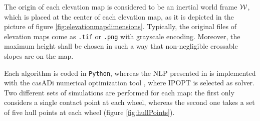The origin of each elevation map is considered to be an inertial world frame $\mathcal{W}$, which is placed at the center of each elevation map, as it is depicted in the picture of figure \ref{fig:elevationmapdimensions}. Typically, the original files of elevation maps come as \texttt{.tif} or \texttt{.png} with grayscale encoding. Moreover, the maximum height shall be chosen in such a way that non-negligible crossable slopes are on the map.

Each algorithm is coded in \texttt{Python}, whereas the NLP presented in  is implemented with the casADi numerical optimization tool \cite{Andersson2018}, where IPOPT \cite{wachter2006implementation} is selected as solver. Two different sets of simulations are performed for each map: the first only considers a single contact point at each wheel, whereas the second one takes a set of five hull points at each wheel (figure \ref{fig:hullPoints}).

